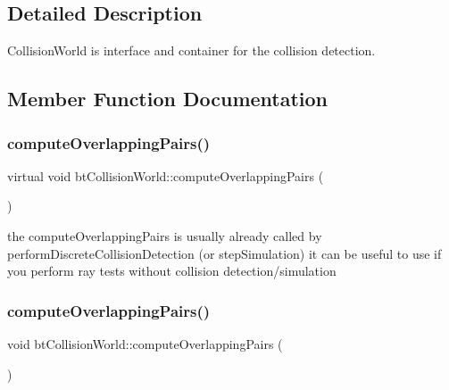 \subsection{Detailed Description}
Collision\+World is interface and container for the collision detection. 

\subsection{Member Function Documentation}
\mbox{\label{classbtCollisionWorld_a91a0511ba3176f9cc1b58759262f9bd3}} 
\subsubsection{\texorpdfstring{compute\+Overlapping\+Pairs()}{computeOverlappingPairs()}\hspace{0.1cm}{\footnotesize\ttfamily [1/2]}}
{\footnotesize\ttfamily virtual void bt\+Collision\+World\+::compute\+Overlapping\+Pairs (\begin{DoxyParamCaption}{ }\end{DoxyParamCaption})\hspace{0.3cm}{\ttfamily [virtual]}}

the compute\+Overlapping\+Pairs is usually already called by perform\+Discrete\+Collision\+Detection (or step\+Simulation) it can be useful to use if you perform ray tests without collision detection/simulation \mbox{\label{classbtCollisionWorld_afb32fb7ecb40aa6247fd3df18ba81098}} 
\subsubsection{\texorpdfstring{compute\+Overlapping\+Pairs()}{computeOverlappingPairs()}\hspace{0.1cm}{\footnotesize\ttfamily [2/2]}}
{\footnotesize\ttfamily void bt\+Collision\+World\+::compute\+Overlapping\+Pairs (\begin{DoxyParamCaption}{ }\end{DoxyParamCaption})\hspace{0.3cm}{\ttfamily [virtual]}}

